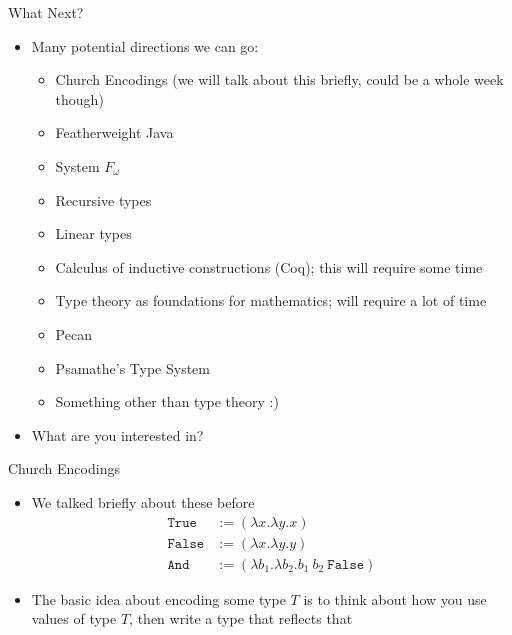 \documentclass[leqno,presentation,usenames,dvipsnames]{beamer}
\begin{document}
\begin{frame}{What Next?}
    \begin{itemize}
        \item Many potential directions we can go:
            \begin{itemize}
                \item Church Encodings (we will talk about this briefly, could be a whole week though)
                \item Featherweight Java
                \item System $F_\omega$
                \item Recursive types
                \item Linear types
                \item Calculus of inductive constructions (Coq); this will require some time
                \item Type theory as foundations for mathematics; will require a lot of time
                \item Pecan
                \item Psamathe's Type System
                \item Something other than type theory :)
            \end{itemize}
        \item What are you interested in?
    \end{itemize}
\end{frame}

\begin{frame}[fragile]{Church Encodings}
    \begin{itemize}
        \item We talked briefly about these before
\begin{align*}
    \texttt{True} & := (\lambda x. \lambda y. x) \\
    \texttt{False} & := (\lambda x. \lambda y. y) \\
    \texttt{And} & := (\lambda b_1. \lambda b_2. b_1~b_2~\texttt{False})
\end{align*}
        \item The basic idea about encoding some type $T$ is to think about how you use values of type $T$, then write a type that reflects that
    \end{itemize}
\end{frame}
\end{document}
